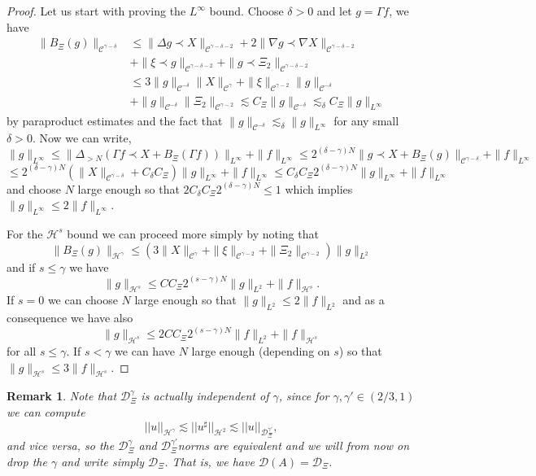 \documentclass[11pt, oneside]{article}   	%
\newtheorem{remark}[theorem]{Remark}
\newcommand{\CC}{\mathscr{C}}
\newcommand{\ssp}{\mathscr{H}}
\begin{document}
\begin{proof}
	Let us start with proving the $L^{\infty}$ bound. Choose $\delta > 0$ and
	let $g = \Gamma f$, we have
	\begin{align*}
	\| B_{\Xi} (g) \|_{\CC^{\gamma - \delta}} & \le \| \Delta g \prec X
	\|_{\CC^{\gamma - \delta - 2}} + 2 \| \nabla g \prec \nabla X \|_{\CC^{\gamma
			- \delta - 2}}\\ 
		&+ \| \xi \prec g \|_{\CC^{\gamma - \delta - 2}} + \| g \prec
	\Xi_2 \|_{\CC^{\gamma - \delta - 2}} \\
	& \le 3 \| g \|_{\CC^{- \delta}} \| X \|_{\CC^{\gamma}} + \| \xi
	\|_{\CC^{\gamma - 2}} \| g \|_{\CC^{- \delta}}\\
	 &+ \| g \|_{ \CC^{- \delta}} \| \Xi_2 \|_{\CC^{\gamma - 2}} \lesssim C_{\Xi} \| g \|_{ \CC^{- \delta}}
	\lesssim_{\delta} C_{\Xi} \| g \|_{L^{\infty}} 
	\end{align*}
	by paraproduct estimates and the fact that $\| g \|_{ \CC^{- \delta}}
	\lesssim_{\delta} \| g \|_{L^{\infty}}$ for any small $\delta > 0$. Now we can write,
	\[ \| g \|_{L^{\infty}} \le \| \Delta_{> N} (\Gamma f \prec X +
	B_{\Xi} (\Gamma f)) \|_{L^{\infty}} + \| f \|_{L^{\infty}} \le
	2^{(\delta - \gamma) N} \| g \prec X + B_{\Xi} (g) \|_{\CC^{\gamma -
			\delta}} + \| f \|_{L^{\infty}} \]
	\[ \le 2^{(\delta - \gamma) N} (\| X \|_{\CC^{\gamma - \delta}} +
	C_{\delta} C_{\Xi}) \| g \|_{L^{\infty}} + \| f \|_{L^{\infty}} \le
	C_{\delta} C_{\Xi} 2^{(\delta - \gamma) N} \| g \|_{L^{\infty}} + \| f
	\|_{L^{\infty}} \]
	 and choose $N$ large enough so that $2 C_{\delta} C_{\Xi} 2^{(\delta - \gamma)
		N} \le 1$ which implies $\| g \|_{L^{\infty}} \le 2 \| f
	\|_{L^{\infty}}$.
	
	For the $\ssp^s$ bound we can proceed more simply by noting that
	\[ \| B_{\Xi} (g) \|_{\ssp^{\gamma}} \le (3 \| X \|_{\CC^{\gamma}} + \| \xi
	\|_{\CC^{\gamma - 2}} + \| \Xi_2\|_{\CC^{\gamma - 2}}) \| g
	\|_{L^2} \]
	and if $s \le \gamma$ we have
	\[ \| g \|_{\ssp^s} \le C C_{\Xi} 2^{(s - \gamma) N} \| g \|_{L^2} + \| f
	\|_{\ssp^s} . \]
	If $s = 0$ we can choose $N$ large enough so that $\| g \|_{L^2} \le 2
	\| f \|_{L^2}$ and as a consequence we have also
	\[ \| g \|_{\ssp^s} \le 2 C C_{\Xi} 2^{(s - \gamma) N}  \| f \|_{L^2} +
	\| f \|_{\ssp^s} \]
	for all $s \le \gamma$. If $s < \gamma$ we can have $N$ large enough
	(depending on $s$) so that $\| g \|_{\ssp^s} \le 3 \| f \|_{\ssp^s}$.
\end{proof}




\begin{remark}\upshape\upshape
	Note that $\mathscr{D}^\gamma_\Xi$ is actually independent of $\gamma$, since for $\gamma,\gamma'\in(2/3,1)$ we can compute
	\[
	||u||_{\ssp^\gamma}\lesssim ||u^\sharp||_{\ssp^2}\lesssim||u||_{\mathscr{D}^{\gamma'}_{\Xi}},
	\]
	and vice versa, so the $\mathscr{D}_\Xi^\gamma$ and $\mathscr{D}_\Xi^{\gamma'}$norms are equivalent and we will from now on drop the $\gamma$ and write simply $\mathscr{D}_\Xi$.  That is, we have $\mathscr{D}(A) = \mathscr{D}_\Xi$.
\end{remark}
\end{document}
